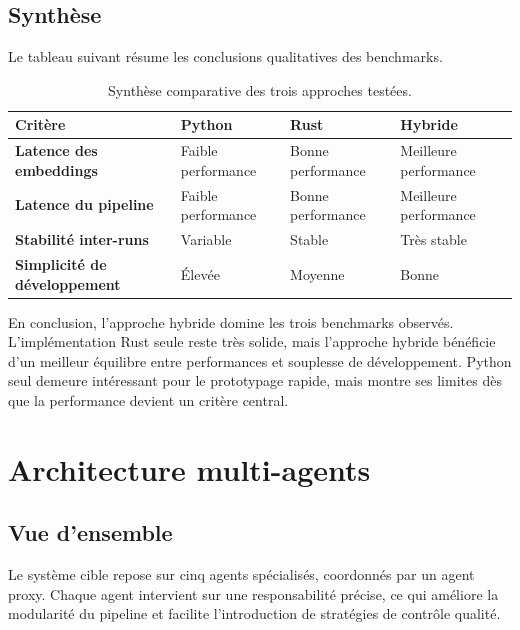 \documentclass[12pt,a4paper]{report}
\begin{document}
\section{Synthèse}

Le tableau suivant résume les conclusions qualitatives des benchmarks.

\begin{table}[H]
  \centering
  \renewcommand{\arraystretch}{1.25}
  \small
  \begin{tabularx}{\textwidth}{>{\bfseries}p{4.2cm} >{\centering\arraybackslash}X >{\centering\arraybackslash}X >{\centering\arraybackslash}X}
    \toprule
    Critère & Python & Rust & Hybride \\
    \midrule
    Latence des embeddings & Faible performance & Bonne performance & Meilleure performance \\
    Latence du pipeline & Faible performance & Bonne performance & Meilleure performance \\
    Stabilité inter-runs & Variable & Stable & Très stable \\
    Simplicité de développement & Élevée & Moyenne & Bonne \\
    \bottomrule
  \end{tabularx}
  \caption{Synthèse comparative des trois approches testées.}
\end{table}

En conclusion, l'approche hybride domine les trois benchmarks observés. L'implémentation Rust seule reste très solide, mais l'approche hybride bénéficie d'un meilleur équilibre entre performances et souplesse de développement. Python seul demeure intéressant pour le prototypage rapide, mais montre ses limites dès que la performance devient un critère central.

\chapter{Architecture multi-agents}

\section{Vue d'ensemble}

Le système cible repose sur cinq agents spécialisés, coordonnés par un agent proxy. Chaque agent intervient sur une responsabilité précise, ce qui améliore la modularité du pipeline et facilite l'introduction de stratégies de contrôle qualité.
\end{document}
